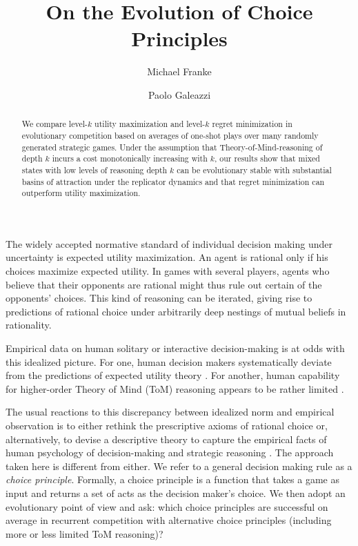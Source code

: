 \documentclass{llncs}
\title{On the Evolution of Choice Principles}
\author{Michael Franke\inst{1} \and Paolo Galeazzi \inst{2}}
\institute{Department of Linguistics, University of T\"{u}bingen \and
  Institute for Logic, Language and Computation, Universiteit van Amsterdam}
\date{}
\begin{document}
\maketitle

\begin{abstract}
  We compare level-$k$ utility maximization and level-$k$ regret
  minimization in evolutionary competition based on averages of
  one-shot plays over many randomly generated strategic games. Under
  the assumption that Theory-of-Mind-reasoning of depth $k$ incurs a
  cost monotonically increasing with $k$, our results show that mixed
  states with low levels of reasoning depth $k$ can be evolutionary
  stable with substantial basins of attraction under the replicator
  dynamics and that regret minimization can outperform utility
  maximization.
\end{abstract}

\noindent The widely accepted normative standard of individual
decision making under uncertainty is expected utility maximization. An
agent is rational only if his choices maximize expected utility. In
games with several players, agents who believe that their opponents
are rational might thus rule out certain of the opponents'
choices. This kind of reasoning can be iterated, giving rise to
predictions of rational choice under arbitrarily deep nestings of
mutual beliefs in
rationality. %

Empirical data on human solitary or interactive decision-making is at
odds with this idealized picture. For one, human decision makers
systematically deviate from the predictions of expected utility theory
\citep[e.g.][]{TverskyKahnemann1974:Judgement-under,TverskyKahnemann1981:The-Framing-of-}. For
another, human capability for higher-order Theory of Mind (ToM)
reasoning appears to be rather limited \citep[e.g.][inter
alia]{HoCamerer1998:Iterated-Domina,KeyzarLin2003:Limits-on-Theor,VerbruggeMol2008:Learning-to-App,DegenFranke2013:Cost-Based-Prag}.

The usual reactions to this discrepancy between idealized norm and
empirical observation is to either rethink the prescriptive axioms of
rational choice or, alternatively, to devise a descriptive theory to
capture the empirical facts of human psychology of decision-making and
strategic reasoning
\citep[e.g.][]{Camerer2003:Behavioral-Game,GlimcherCamerer2009:Neuroeconomics:}. The
approach taken here is different from either. We refer to a general
decision making rule as a \emph{choice principle}. Formally, a choice
principle is a function that takes a game as input and returns a set
of acts as the decision maker's choice. We then adopt an evolutionary
point of view and ask: which choice principles are successful on
average in recurrent competition with alternative choice principles
(including more or less limited ToM reasoning)?
\end{document}
